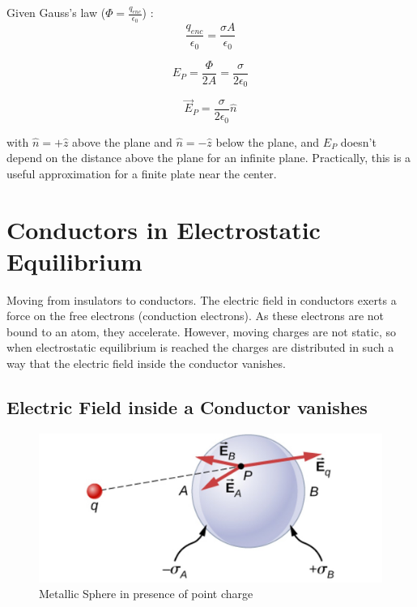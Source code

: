 \documentclass[14pt]{memoir}
\begin{document}
Given Gauss's law ($\Phi = \frac{q_{enc}}{\epsilon_0}$) :
\begin{equation}
\frac{q_{enc}}{\epsilon_0} = \frac{\sigma A}{\epsilon_0}
\end{equation}

\begin{equation}
E_P = \frac{\Phi}{2A} = \frac{\sigma}{2 \epsilon_0}
\end{equation}

\begin{equation}
\vec{E}_P = \frac{\sigma}{2 \epsilon_0} \hat{n}
\end{equation}

with $\hat{n} = +\hat{z}$ above the plane and $\hat{n} = -\hat{z}$ below the plane, and $E_P$ doesn't depend on the distance above the plane for an infinite plane. Practically, this is  a useful approximation for a finite plate near the center. 

\section{Conductors in Electrostatic Equilibrium}
Moving from insulators to conductors. The electric field in conductors exerts a force on the free electrons (conduction electrons). As these electrons are not bound to an atom, they accelerate. However, moving charges are not static, so when electrostatic equilibrium is reached the charges are distributed in such a way that the electric field inside the conductor vanishes. 

\subsection{Electric Field inside a Conductor vanishes}

\begin{figure}[H]
\begin{center}
\includegraphics[scale=0.40]{fig/fig_06_35.jpg}
\caption{Metallic Sphere in presence of point charge}
\label{fig:06_35}
\end{center}
\end{figure}
\end{document}
